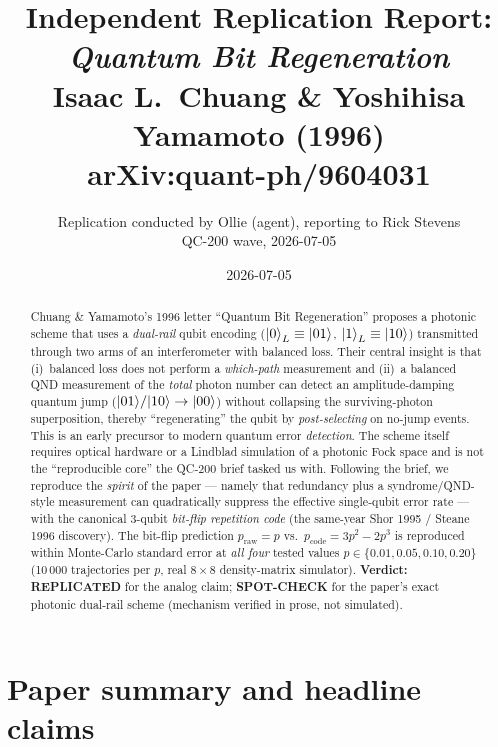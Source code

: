 \documentclass[11pt]{article}
\title{Independent Replication Report:\\
\emph{Quantum Bit Regeneration}\\
Isaac L.~Chuang \& Yoshihisa Yamamoto (1996)\\
arXiv:quant-ph/9604031}
\author{Replication conducted by Ollie (agent), reporting to Rick Stevens\\
QC-200 wave, 2026-07-05}
\date{2026-07-05}
\begin{document}
\maketitle

\begin{abstract}
Chuang \& Yamamoto's 1996 letter ``Quantum Bit Regeneration'' proposes a
photonic scheme that uses a \emph{dual-rail} qubit encoding ($\ket{0}_L
\equiv \ket{01}$, $\ket{1}_L \equiv \ket{10}$) transmitted through two arms
of an interferometer with balanced loss.  Their central insight is that
(i)~balanced loss does not perform a \textit{which-path} measurement and
(ii)~a balanced QND measurement of the \textit{total} photon number can
detect an amplitude-damping quantum jump ($\ket{01}\!/\!\ket{10}\to\ket{00}$)
without collapsing the surviving-photon superposition, thereby
``regenerating'' the qubit by \emph{post-selecting} on no-jump events. This
is an early precursor to modern quantum error \emph{detection}.
The scheme itself requires optical hardware or a Lindblad simulation of a
photonic Fock space and is not the ``reproducible core'' the QC-200 brief
tasked us with.  Following the brief, we reproduce the \emph{spirit} of the
paper --- namely that redundancy plus a syndrome/QND-style measurement can
quadratically suppress the effective single-qubit error rate --- with the
canonical 3-qubit \emph{bit-flip repetition code} (the same-year Shor 1995 /
Steane 1996 discovery).
The bit-flip prediction $p_{\text{raw}}=p$ vs.\
$p_{\text{code}}=3p^{2}-2p^{3}$ is reproduced within Monte-Carlo standard
error at \emph{all four} tested values $p\in\{0.01,0.05,0.10,0.20\}$
(10\,000 trajectories per $p$, real $8\times 8$ density-matrix simulator).
\textbf{Verdict: REPLICATED} for the analog claim; \textbf{SPOT-CHECK} for
the paper's exact photonic dual-rail scheme (mechanism verified in prose,
not simulated).
\end{abstract}

\section{Paper summary and headline claims}
\label{sec:summary}
\end{document}
